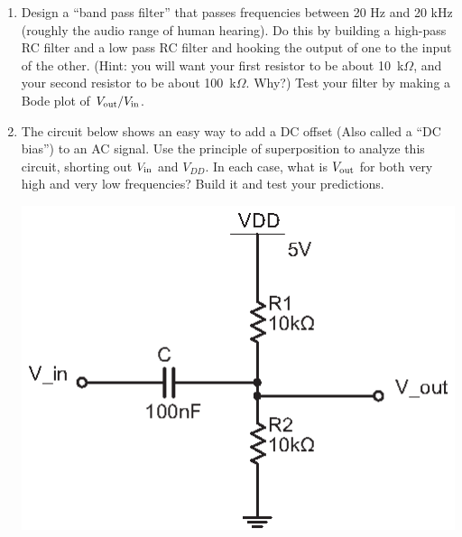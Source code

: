 \begin{enumerate}[wide]
\item Design a ``band pass filter'' that passes frequencies between 20 Hz and 20 kHz (roughly the audio range of human hearing).  Do this by building a high-pass RC filter and a low pass RC filter and hooking the output of one to the input of the other.  (Hint: you will want your first resistor to be about 10~k$\Omega$, and your second resistor to be about 100~k$\Omega$.  Why?)   Test your filter by making a Bode plot of $V_{\rm out}/V_{\rm in}$.\label{part_band_pass_filter}



\item The circuit below shows an easy way to add a DC offset (Also called a ``DC bias'') to an AC signal.  Use the principle of superposition to analyze this circuit, shorting out $V_{\rm in}$ and $V_{DD}$.  In each case, what is $V_{\rm out}$ for both very high and very low frequencies?  Build it and test your predictions. \label{part_DC_bias}
\begin{center}
\includegraphics{filters/DC_biasing.eps}
\end{center}


\end{enumerate}
